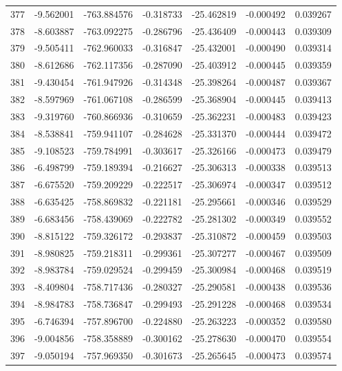 \begin{tabular}{rrrrrrr}
 377 &  -9.562001 & -763.884576 & -0.318733 &  -25.462819 &   -0.000492 &  0.039267 \\
 378 &  -8.603887 & -763.092275 & -0.286796 &  -25.436409 &   -0.000443 &  0.039309 \\
 379 &  -9.505411 & -762.960033 & -0.316847 &  -25.432001 &   -0.000490 &  0.039314 \\
 380 &  -8.612686 & -762.117356 & -0.287090 &  -25.403912 &   -0.000445 &  0.039359 \\
 381 &  -9.430454 & -761.947926 & -0.314348 &  -25.398264 &   -0.000487 &  0.039367 \\
 382 &  -8.597969 & -761.067108 & -0.286599 &  -25.368904 &   -0.000445 &  0.039413 \\
 383 &  -9.319760 & -760.866936 & -0.310659 &  -25.362231 &   -0.000483 &  0.039423 \\
 384 &  -8.538841 & -759.941107 & -0.284628 &  -25.331370 &   -0.000444 &  0.039472 \\
 385 &  -9.108523 & -759.784991 & -0.303617 &  -25.326166 &   -0.000473 &  0.039479 \\
 386 &  -6.498799 & -759.189394 & -0.216627 &  -25.306313 &   -0.000338 &  0.039513 \\
 387 &  -6.675520 & -759.209229 & -0.222517 &  -25.306974 &   -0.000347 &  0.039512 \\
 388 &  -6.635425 & -758.869832 & -0.221181 &  -25.295661 &   -0.000346 &  0.039529 \\
 389 &  -6.683456 & -758.439069 & -0.222782 &  -25.281302 &   -0.000349 &  0.039552 \\
 390 &  -8.815122 & -759.326172 & -0.293837 &  -25.310872 &   -0.000459 &  0.039503 \\
 391 &  -8.980825 & -759.218311 & -0.299361 &  -25.307277 &   -0.000467 &  0.039509 \\
 392 &  -8.983784 & -759.029524 & -0.299459 &  -25.300984 &   -0.000468 &  0.039519 \\
 393 &  -8.409804 & -758.717436 & -0.280327 &  -25.290581 &   -0.000438 &  0.039536 \\
 394 &  -8.984783 & -758.736847 & -0.299493 &  -25.291228 &   -0.000468 &  0.039534 \\
 395 &  -6.746394 & -757.896700 & -0.224880 &  -25.263223 &   -0.000352 &  0.039580 \\
 396 &  -9.004856 & -758.358889 & -0.300162 &  -25.278630 &   -0.000470 &  0.039554 \\
 397 &  -9.050194 & -757.969350 & -0.301673 &  -25.265645 &   -0.000473 &  0.039574 \\

\end{tabular}
